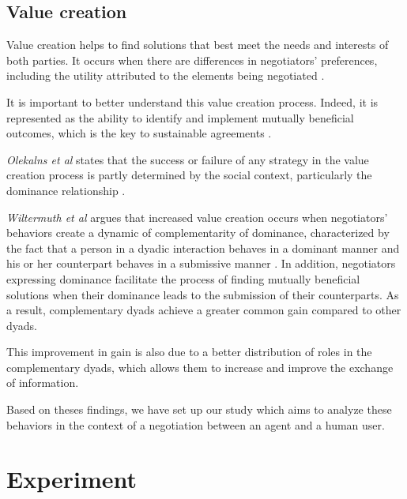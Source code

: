 \documentclass[10pt, a4paper, twocolumn]{article} %
\begin{document}
		\subsection{Value creation}
				
				Value creation helps to find solutions that best meet the needs and interests of both parties. It occurs when there are differences in negotiators' preferences, including the utility attributed to the elements being negotiated \cite{lax1986managerial}. 
				
				It is important to better understand this value creation process. Indeed, it is represented as the ability to identify and implement mutually beneficial outcomes, which is the key to sustainable agreements \cite{wiltermuth2015benefits}.
				
				\emph{Olekalns et al} states that the success or failure of any strategy in the value creation process is partly determined by the social context, particularly the dominance relationship \cite{olekalns2013dyadic}.
				
				\emph{Wiltermuth et al} argues that increased value creation occurs when negotiators' behaviors create a dynamic of complementarity of dominance, characterized by the fact that a person in a dyadic interaction behaves in a dominant manner and his or her counterpart behaves in a submissive manner \cite{wiltermuth2015benefits}. In addition, negotiators expressing dominance facilitate the process of finding mutually beneficial solutions when their dominance leads to the submission of their counterparts. As a result, complementary dyads achieve a greater common gain compared to other dyads.
				
				This improvement in gain is also due to a better distribution of roles in the complementary dyads, which allows them to increase and improve the exchange of information. 

				Based on theses findings, we have set up our study which aims to analyze these behaviors in the context of a negotiation between an agent and a human user.


\section{Experiment}

	
					
			

\printbibliography[title={Bibliography}] %

\end{document}
